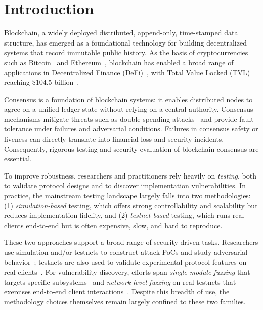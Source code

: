 \section{Introduction}
Blockchain, a widely deployed distributed, append-only, time-stamped data structure, has emerged as a foundational technology for building decentralized systems that record immutable public history. As the basis of cryptocurrencies such as Bitcoin~\cite{bitcoin} and Ethereum~\cite{ethereum}, blockchain has enabled a broad range of applications in Decentralized Finance (DeFi)~\cite{werner2022defisok,jensen2021introduction}, with Total Value Locked (TVL) reaching \$104.5 billion~\cite{defillama}. 

Consensus is a foundation of blockchain systems: it enables distributed nodes to agree on a unified ledger state without relying on a central authority. Consensus mechanisms mitigate threats such as double-spending attacks~\cite{chohan2021double,karame2012double} and provide fault tolerance under failures and adversarial conditions. Failures in consensus safety or liveness can directly translate into financial loss and security incidents. Consequently, rigorous testing and security evaluation of blockchain consensus are essential.

To improve robustness, researchers and practitioners rely heavily on \emph{testing}, both to validate protocol designs and to discover implementation vulnerabilities. In practice, the mainstream testing landscape largely falls into two methodologies: (1) \emph{simulation-based} testing, which offers strong controllability and scalability but reduces implementation fidelity, and (2) \emph{testnet-based} testing, which runs real clients end-to-end but is often expensive, slow, and hard to reproduce.

These two approaches support a broad range of security-driven tasks. Researchers use simulation and/or testnets to construct attack PoCs and study adversarial behavior~\cite{3posAttack,neuder2021low,neu2021ebb,yaish2024speculative,zhang2024max}; testnets are also used to validate experimental protocol features on real clients~\cite{zhang2025reorg}. For vulnerability discovery, efforts span \emph{single-module fuzzing} that targets specific subsystems~\cite{yang2021fluffy,wang2024mempoolfuzz} and \emph{network-level fuzzing} on real testnets that exercises end-to-end client interactions~\cite{ma2023phoenix,chen2023tyr,ma2023loki}. Despite this breadth of use, the methodology choices themselves remain largely confined to these two families.

